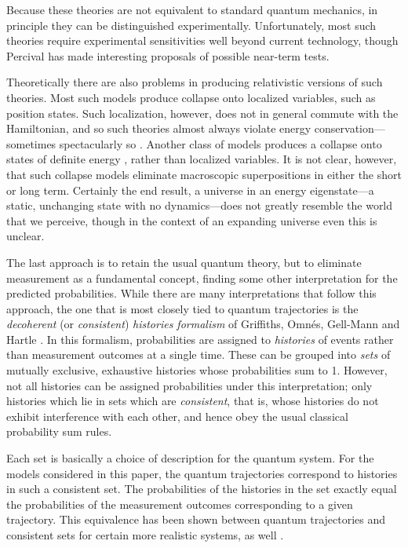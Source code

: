 \documentclass[12pt]{article}
\begin{document}
Because these theories are not equivalent to standard quantum mechanics,
in principle they can be distinguished experimentally.  Unfortunately,
most such theories require experimental sensitivities well beyond current
technology, though Percival \cite{Percival2,Percival3}
has made interesting proposals of possible near-term tests.

Theoretically there are also problems in producing relativistic versions
of such theories.  Most such models produce collapse onto localized
variables, such as position states.  Such localization, however, does not
in general commute with the Hamiltonian, and so such theories almost
always violate energy conservation---sometimes spectacularly so
\cite{Adler}.  Another class of models produces a collapse
onto states of definite energy \cite{Diosi,Penrose,Percival2},
rather than localized variables.  It is not clear, however, that
such collapse models eliminate macroscopic superpositions in either the
short or long term.  Certainly the end result, a universe in an energy
eigenstate---a static, unchanging state with no dynamics---does not
greatly resemble the world that we perceive, though in the context of an
expanding universe even this is unclear.

The last approach is to retain the usual quantum theory, but to eliminate
measurement as a fundamental concept, finding some other interpretation
for the predicted probabilities.  While there are many interpretations
that follow this approach, the one that is most closely tied to quantum
trajectories is the {\it decoherent} (or {\it consistent}) {\it histories
formalism} of Griffiths, Omn\'es, Gell-Mann and Hartle
\cite{Griffiths,Omnes,GellMann}.  In this formalism,
probabilities are assigned to {\it histories} of events rather than
measurement outcomes at a single time.  These can be
grouped into {\it sets} of mutually exclusive, exhaustive histories whose
probabilities sum to 1.  However, not all histories can be assigned
probabilities under this interpretation; only histories which lie in sets
which are {\it consistent}, that is, whose histories do not
exhibit interference with each other, and hence obey the usual
classical probability sum rules.

Each set is basically a choice of description for the quantum system.
For the models considered in this paper, the quantum trajectories correspond
to histories in such a consistent set.  The probabilities of the
histories in the set exactly equal the probabilities of the measurement
outcomes corresponding to a given trajectory.  This equivalence has been
shown between quantum trajectories and consistent sets for certain more
realistic systems, as well \cite{DGHP,Brun1,Brun2}.
\end{document}
